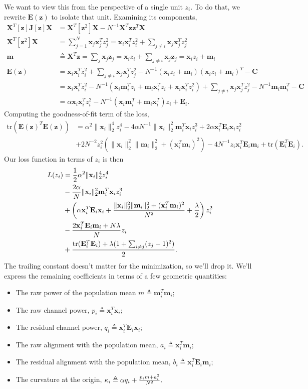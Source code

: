 \documentclass[10pt]{article}
\newcommand{\XX}{\mathbf{X}}
\newcommand{\EE}{\mathbf{E}}
\newcommand{\JJ}{\mathbf{J}}
\newcommand{\CC}{\mathbf{C}}
\newcommand{\xx}{\mathbf{x}}
\newcommand{\ka}{\kappa}
\newcommand{\zz}{\mathbf{z}}
\newcommand{\mm}{\mathbf{m}}
\newcommand{\tr}{\text{tr}}
\begin{document}
We want to view this from the perspective of a single unit $z_i$. To do that, we rewrite $\EE(\zz)$ to isolate that unit. Examining its components,
\begin{align*}
  \XX^T [\zz] \JJ [\zz] \XX &= \XX^T [\zz^2]\XX - N^{-1} \XX^T \zz \zz^T \XX\\
  \XX^T [\zz^2]\XX &= \sum_{j=1}^N \xx_j \xx_j^T z_j^2 = \xx_i \xx_i^T z_i^2 + \sum_{j\neq i} \xx_j \xx_j^T z_j^2\\
  \mm &\triangleq \XX^T \zz = \sum_j \xx_j \zz_j = \xx_i z_i + \sum_{j \neq i} \xx_j \zz_j = \xx_i z_i + \mm_i\\
  \EE(\zz) &= \xx_i \xx_i^T z_i^2 + \sum_{j \neq i} \xx_j \xx_j^T z_j^2 - N^{-1}(\xx_i z_i + \mm_i)(\xx_i z_i + \mm_i)^T - \CC\\
  &= \xx_i \xx_i^T z_i^2 - N^{-1}(\xx_i \mm_i^T z_i + \mm_i \xx_i^T z_i + \xx_i \xx_i^T z_i^2) + \sum_{j\neq i} \xx_j \xx_j^T z_j^2 - N^{-1} \mm_i \mm_i^T - \CC \\
  &= \alpha \xx_i \xx_i^T z_i^2 - N^{-1} (\xx_i \mm_i^T + \mm_i \xx_i^T) z_i + \EE_i.
\end{align*}
Computing the goodness-of-fit term of the loss,
\begin{align*}
\tr(\EE(\zz)^T \EE(\zz)) &= \alpha^2\|\xx_i\|_2^4 z_i^4 - 4 \alpha N^{-1} \|\xx_i\|_2^2 \mm_i^T \xx_i z_i^3 + 2\alpha \xx_i^T \EE_i \xx_i z_i^2\\ &+ 2 N^{-2} z_i^2 (\|\xx_i\|_2^2 \|\mm_i\|_2^2 + (\xx_i^T \mm_i)^2) - 4 N^{-1} z_i \xx_i^T \EE_i \mm_i + \tr(\EE_i^T \EE_i).  
\end{align*}
Our loss function in terms of $z_i$ is then \begin{align*}
  L(z_i) &= {1 \over 2}\alpha^2 \|\xx_i\|_2^4 z_i^4  \\
  &-  {2 \alpha \over N} \|\xx_i\|_2^2 \mm_i^T \xx_i z_i^3 \\
  &+ \left(\alpha \xx_i^T \EE_i \xx_i + {\|\xx_i\|_2^2 \|\mm_i\|_2^2 + (\xx_i^T \mm_i)^2 \over N^2} +  {\lambda\over 2}\right)z_i^2  \\
  &-{2 \xx_i^T \EE_i \mm_i + N \lambda \over N} z_i \\
  &+ {\tr(\EE_i^T \EE_i) + \lambda( 1 + \sum_{i\neq j} (z_j -1)^2) \over 2}.
\end{align*}
The trailing constant doesn't matter for the minimization, so we'll drop it. We'll express the remaining coefficients in terms of a few geometric quantities:
\begin{itemize}
  \item The raw power of the population mean $m \triangleq \mm_i^T \mm_i$;
\item The raw channel power, $p_i \triangleq \xx_i^T \xx_i$;
  \item The residual channel power, $q_i \triangleq \xx_i^T \EE_i \xx_i$;
\item The raw alignment with the population mean, $a_i \triangleq \xx_i^T \mm_i$;
\item The residual alignment with the population mean, $b_i \triangleq \xx_i^T \EE_i \mm_i$;
  \item The curvature at the origin, $\ka_i \triangleq \alpha q_i + {p_i m + a_i^2 \over N^2}.$
  \end{itemize}
\end{document}
